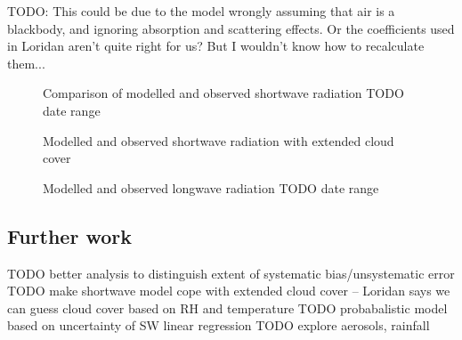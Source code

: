\documentclass[a4paper,titlepage]{article}
\begin{document}
TODO: This could be due to the model wrongly assuming that air is a blackbody, and ignoring absorption and scattering effects.  Or the coefficients used in Loridan aren't quite right for us?  But I wouldn't know how to recalculate them...
\begin {figure}
\centering

\caption{Comparison of modelled and observed shortwave radiation TODO date range}
\label{fig:shortwave-verification}
\end{figure}

\begin{figure}
\centering

\caption{Modelled and observed shortwave radiation with extended cloud cover}
\label{fig:extended-cloud}
\end{figure}

\begin{figure}
\centering

\caption{Modelled and observed longwave radiation TODO date range}
\label{fig:longwave-verification}
\end{figure}

\subsection{Further work}
\label{sec:further-work}
TODO better analysis to distinguish extent of systematic bias/unsystematic error
TODO make shortwave model cope with extended cloud cover -- Loridan says we can guess cloud cover based on RH and temperature
TODO probabalistic model based on uncertainty of SW linear regression
TODO explore aerosols, rainfall
\end{document}
